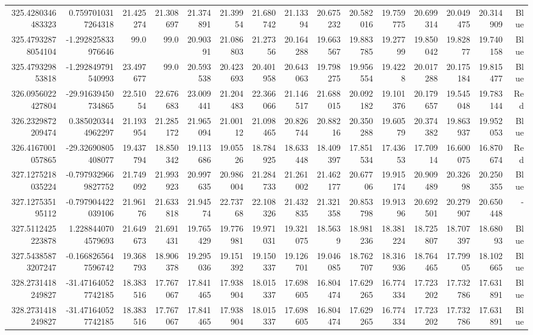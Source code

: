 \begin{center}
\begin{longtable}{rrrrrrrrrrrrrrr}
325.4280346483323 & 0.7597010317264318 & 21.425274 & 21.308697 & 21.374891 & 21.39954 & 21.680742 & 21.13394 & 20.675232 & 20.582016 & 19.759775 & 20.699314 & 20.049475 & 20.314909 & Blue \\
325.47932878054104 & -1.292825833976646 & 99.0 & 99.0 & 20.90391 & 21.086803 & 21.27356 & 20.164288 & 19.663567 & 19.883785 & 19.27799 & 19.850042 & 19.82877 & 19.740158 & Blue \\
325.479329853818 & -1.292849791540993 & 23.497677 & 99.0 & 20.593538 & 20.423693 & 20.401958 & 20.643063 & 19.798275 & 19.956554 & 19.4228 & 20.017288 & 20.175184 & 19.815477 & Blue \\
326.0956022427804 & -29.91639450734865 & 22.51054 & 22.676683 & 23.009441 & 21.204483 & 22.366066 & 21.146517 & 21.688015 & 20.092182 & 19.101376 & 20.179657 & 19.545048 & 19.783144 & Red \\
326.2329872209474 & 0.3850203444962297 & 21.193954 & 21.285172 & 21.965094 & 21.00112 & 21.098465 & 20.826744 & 20.88216 & 20.350288 & 19.60579 & 20.374382 & 19.863937 & 19.952053 & Blue \\
326.4167001057865 & -29.32690805408077 & 19.437794 & 18.850342 & 19.113686 & 19.05526 & 18.784925 & 18.633448 & 18.409397 & 17.851534 & 17.43653 & 17.70914 & 16.600075 & 16.870674 & Red \\
327.1275218035224 & -0.7979329669827752 & 21.749092 & 21.993923 & 20.997635 & 20.986004 & 21.284733 & 21.261002 & 21.462177 & 20.67706 & 19.915174 & 20.909489 & 20.32698 & 20.250355 & Blue \\
327.127535195112 & -0.797904422039106 & 21.96176 & 21.633818 & 21.94574 & 22.73768 & 22.108326 & 21.432835 & 21.321358 & 20.853798 & 19.91396 & 20.692501 & 20.279907 & 20.650448 & - \\
327.5112425223878 & 1.2288440704579693 & 21.649673 & 21.691431 & 19.765429 & 19.776981 & 19.971031 & 19.321075 & 18.5639 & 18.981236 & 18.381224 & 18.725807 & 18.707397 & 18.68093 & Blue \\
327.54385873207247 & -0.1668265647596742 & 19.368793 & 18.906378 & 19.295036 & 19.151392 & 19.150337 & 19.126701 & 19.046085 & 18.762707 & 18.316936 & 18.764465 & 17.79905 & 18.102665 & Blue \\
328.2731418249827 & -31.471640527742185 & 18.383516 & 17.767067 & 17.841465 & 17.938904 & 18.015337 & 17.698605 & 16.804474 & 17.629265 & 16.774334 & 17.723202 & 17.732786 & 17.631891 & Blue \\
328.2731418249827 & -31.471640527742185 & 18.383516 & 17.767067 & 17.841465 & 17.938904 & 18.015337 & 17.698605 & 16.804474 & 17.629265 & 16.774334 & 17.723202 & 17.732786 & 17.631891 & Blue \\

\end{longtable}
\end{center}
